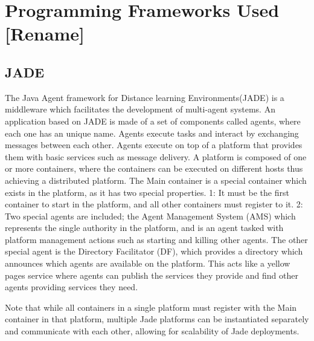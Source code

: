  \section{Programming Frameworks Used [Rename]}

 \subsection{JADE}
 The Java Agent framework for Distance learning Environments(JADE) is a middleware which facilitates the development of multi-agent systems. An application based on JADE is made of a set of components called agents, where each one has an unique name. Agents execute tasks and interact by exchanging messages between each other. Agents execute on top of a platform that provides them with basic services such as message delivery. A platform is composed of one or more containers, where the containers can be executed on different hosts thus achieving a distributed platform. The Main container is a special container which exists in the platform, as it has two special properties. 1: It must be the first container to start in the platform, and all other containers must register to it. 2: Two special agents are included; the Agent Management System (AMS) which represents the single authority in the platform, and is an agent tasked with platform management actions such as starting and killing other agents. The other special agent is the Directory Facilitator (DF), which provides a directory which announces which agents are available on the platform. This acts like a yellow pages service where agents can publish the services they provide and find other agents providing services they need.

 Note that while all containers in a single platform must register with the Main container in that platform, multiple Jade platforms can be instantiated separately and communicate with each other, allowing for scalability of Jade deployments.
 
